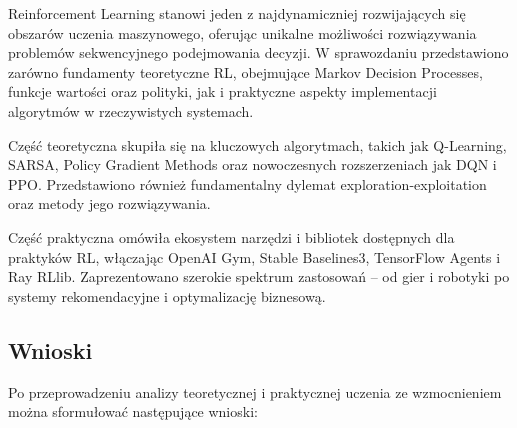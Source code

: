 \documentclass[12pt,a4paper]{article}
\begin{document}
Reinforcement Learning stanowi jeden z najdynamiczniej rozwijających się obszarów uczenia maszynowego, oferując unikalne możliwości rozwiązywania problemów sekwencyjnego podejmowania decyzji. W sprawozdaniu przedstawiono zarówno fundamenty teoretyczne RL, obejmujące Markov Decision Processes, funkcje wartości oraz polityki, jak i praktyczne aspekty implementacji algorytmów w rzeczywistych systemach.

Część teoretyczna skupiła się na kluczowych algorytmach, takich jak Q-Learning, SARSA, Policy Gradient Methods oraz nowoczesnych rozszerzeniach jak DQN i PPO. Przedstawiono również fundamentalny dylemat exploration-exploitation oraz metody jego rozwiązywania.

Część praktyczna omówiła ekosystem narzędzi i bibliotek dostępnych dla praktyków RL, włączając OpenAI Gym, Stable Baselines3, TensorFlow Agents i Ray RLlib. Zaprezentowano szerokie spektrum zastosowań -- od gier i robotyki po systemy rekomendacyjne i optymalizację biznesową.

\subsection{Wnioski}

Po przeprowadzeniu analizy teoretycznej i praktycznej uczenia ze wzmocnieniem można sformułować następujące wnioski:
\end{document}
